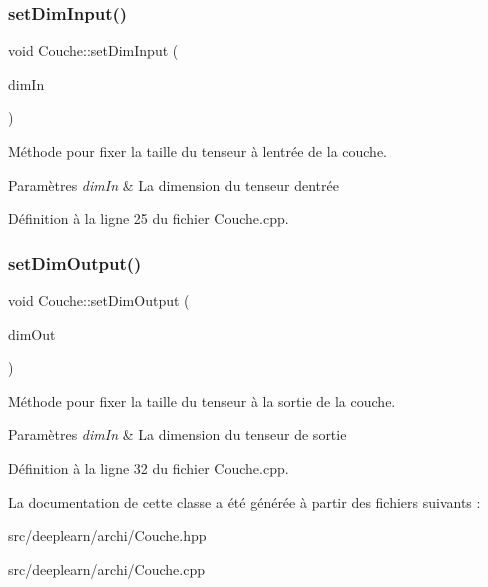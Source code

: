 \subsubsection{\texorpdfstring{set\+Dim\+Input()}{setDimInput()}}
{\footnotesize\ttfamily void Couche\+::set\+Dim\+Input (\begin{DoxyParamCaption}\item[{\hyperlink{class_dim_tenseur}{Dim\+Tenseur}}]{dim\+In }\end{DoxyParamCaption})}



Méthode pour fixer la taille du tenseur à l\textquotesingle{}entrée de la couche. 


\begin{DoxyParams}{Paramètres}
{\em dim\+In} & La dimension du tenseur d\textquotesingle{}entrée \\
\hline
\end{DoxyParams}


Définition à la ligne 25 du fichier Couche.\+cpp.

\mbox{\label{class_couche_a9af2f37eaf1063cb05abe980cfaa4cce}} 
\subsubsection{\texorpdfstring{set\+Dim\+Output()}{setDimOutput()}}
{\footnotesize\ttfamily void Couche\+::set\+Dim\+Output (\begin{DoxyParamCaption}\item[{\hyperlink{class_dim_tenseur}{Dim\+Tenseur}}]{dim\+Out }\end{DoxyParamCaption})}



Méthode pour fixer la taille du tenseur à la sortie de la couche. 


\begin{DoxyParams}{Paramètres}
{\em dim\+In} & La dimension du tenseur de sortie \\
\hline
\end{DoxyParams}


Définition à la ligne 32 du fichier Couche.\+cpp.



La documentation de cette classe a été générée à partir des fichiers suivants \+:\begin{DoxyCompactItemize}
\item 
src/deeplearn/archi/Couche.\+hpp\item 
src/deeplearn/archi/Couche.\+cpp\end{DoxyCompactItemize}

